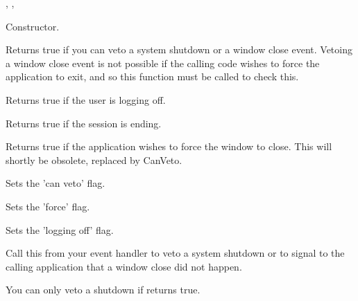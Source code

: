 ,\rtfsp
{},\rtfsp
{}




Constructor.

\label{wxcloseeventcanveto}


Returns true if you can veto a system shutdown or a window close event.
Vetoing a window close event is not possible if the calling code wishes to
force the application to exit, and so this function must be called to check this.

\label{wxcloseeventgetloggingoff}


Returns true if the user is logging off.

\label{wxcloseeventgetsessionending}


Returns true if the session is ending.

\label{wxcloseeventgetforce}


Returns true if the application wishes to force the window to close.
This will shortly be obsolete, replaced by CanVeto.

\label{wxcloseeventsetcanveto}


Sets the 'can veto' flag.

\label{wxcloseeventsetforce}


Sets the 'force' flag.

\label{wxcloseeventsetloggingoff}


Sets the 'logging off' flag.

\label{wxcloseeventveto}


Call this from your event handler to veto a system shutdown or to signal
to the calling application that a window close did not happen.

You can only veto a shutdown if  returns
true.


